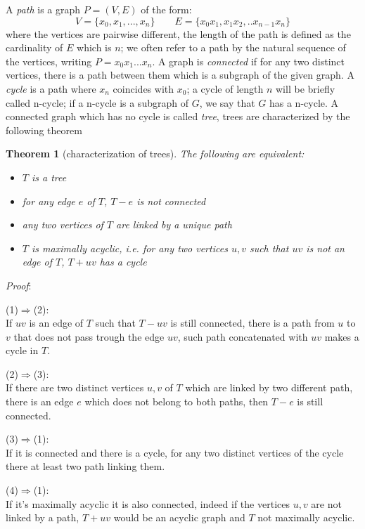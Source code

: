 \documentclass[a4paper,12pt,oneside]{book}
\newtheorem{theorem}{Theorem}[chapter]
\begin{document}
A \textit{path} is a graph $P=(V,E)$ of the form:
$$ V=\{x_0,x_1, ..., x_n\} \qquad E=\{x_0 x_1, x_1x_2,.. x_{n-1}x_n\}$$ 
where the vertices are pairwise different, the length of the path is defined as the cardinality of $E$ which is $n$; we often refer to a path by the natural sequence of the vertices, writing $P=x_0x_1...x_n$. A graph is \textit{connected} if for any two distinct vertices, there is a path between them which is a subgraph of the given graph.  
A \textit{cycle} is a path where $x_n$ coincides with $x_0$; a cycle of length $n$ will be briefly called n-cycle; if a n-cycle is a subgraph of $G$, we say that $G$ has a n-cycle. 
 A connected graph which has no cycle is called \textit{tree}, trees are characterized by the following theorem 

\begin{theorem}[characterization of trees] The following are equivalent:
\begin{itemize}
\item[(1)] $T$ is a tree
\item[(2)] for any edge $e$ of $T$, $T-e$ is not connected   
\item[(3)] any two vertices of $T$ are linked by a unique path
\item[(4)] $T$ is maximally acyclic, i.e. for any two vertices $u,v$ such that $uv$ is not an edge of $T$, $T+uv$ has a cycle
\end{itemize}
\end{theorem}
\noindent\textit{Proof}: 

(1)$\Rightarrow$(2):\\
If $uv$ is an edge of $T$ such that $T-uv$ is still connected, there is a path from $u$ to $v$ that does not pass trough the edge $uv$, such path concatenated with $uv$ makes a cycle in $T$.

(2)$\Rightarrow$(3):\\
If there are two distinct vertices $u,v$ of $T$ which are linked by two different  path, there is an edge $e$ which does not belong to both paths, then $T-e$ is still connected.

(3)$\Rightarrow$(1):\\
If it is connected and there is a cycle, for any two distinct vertices of the cycle there at least two path linking them.

(4)$\Rightarrow$(1):\\
If it's maximally acyclic it is also connected, indeed if the vertices $u,v$ are not linked by a path, $T+uv$ would be an acyclic graph and $T$ not maximally acyclic. 
\end{document}
